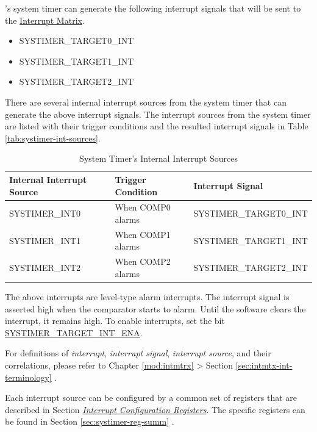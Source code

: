 \documentclass[main\_\_EN.tex]{subfiles}
\begin{document}
\chipname{}'s system timer can generate the following interrupt signals that will be sent to the \hyperref[mod:intmtrx]{Interrupt Matrix}.

    \begin{itemize}
        \item SYSTIMER\_TARGET0\_INT
        \item SYSTIMER\_TARGET1\_INT
        \item SYSTIMER\_TARGET2\_INT
    \end{itemize}

There are several internal interrupt sources from the system timer that can generate the above interrupt signals. The interrupt sources from the system timer are listed with their trigger conditions and the resulted interrupt signals in Table \ref{tab:systimer-int-sources}.

\begin{longtable}{ | L{3cm} | L{5cm} | L{7.5cm} | }
\caption{System Timer's Internal Interrupt Sources} \label{tab:systimer-int-sources}
\\ \hline
{}
\textbf{Internal Interrupt Source} & \textbf{Trigger Condition}  &  \textbf{Interrupt Signal}\\ \hline
\label{int:SYSTIMERINT0}SYSTIMER\_INT0  &  When COMP0 alarms & SYSTIMER\_TARGET0\_INT  \\ \hline
\label{int:SYSTIMERINT1}SYSTIMER\_INT1 &  When COMP1 alarms & SYSTIMER\_TARGET1\_INT \\ \hline
\label{int:SYSTIMERINT2}SYSTIMER\_INT2 &
When COMP2 alarms & SYSTIMER\_TARGET2\_INT  \\ \hline
\end{longtable}

The above interrupts are level-type alarm interrupts. The interrupt signal is asserted high when the comparator starts to alarm. Until the software clears the interrupt, it remains high. To enable interrupts, set the bit \hyperref[fielddesc:SYSTIMERTARGET0INTENA]{SYSTIMER\_TARGET\_INT\_ENA}.

\begin{tiplisting}
For definitions of \textit{interrupt}, \textit{interrupt signal}, \textit{interrupt source}, and their correlations, please refer to Chapter \ref{mod:intmtrx} \textit{} > Section \ref{sec:intmtx-int-terminology} \textit{}.
\end{tiplisting}

Each interrupt source can be configured by a common set of registers that are described in Section \hyperref[interrupt-config-registers]{\textit{Interrupt Configuration Registers}}. The specific registers can be found in Section \ref{sec:systimer-reg-summ} \textit{}.
\end{document}
